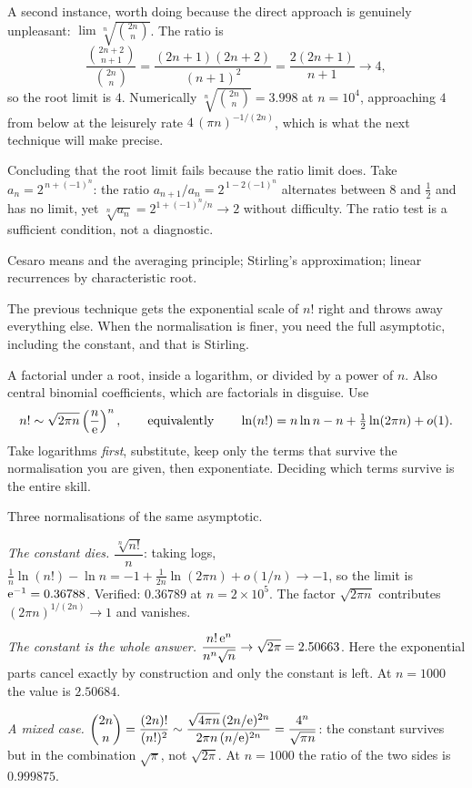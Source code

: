 A second instance, worth doing because the direct approach is genuinely unpleasant: $\lim\sqrt[n]{\binom{2n}{n}}$. The ratio is
\[\frac{\binom{2n+2}{n+1}}{\binom{2n}{n}}=\frac{(2n+1)(2n+2)}{(n+1)^2}=\frac{2(2n+1)}{n+1}\to4,\]
so the root limit is $4$. Numerically $\sqrt[n]{\binom{2n}{n}}=3.998$ at $n=10^4$, approaching $4$ from below at the leisurely rate $4\,(\pi n)^{-1/(2n)}$, which is what the next technique will make precise.

\begin{trap}
Concluding that the root limit fails because the ratio limit does. Take $a_n=2^{\,n+(-1)^n}$: the ratio $a_{n+1}/a_n=2^{\,1-2(-1)^n}$ alternates between $8$ and $\tfrac12$ and has no limit, yet $\sqrt[n]{a_n}=2^{1+(-1)^n/n}\to2$ without difficulty. The ratio test is a sufficient condition, not a diagnostic.
\end{trap}

\begin{seealsob}Cesaro means and the averaging principle; Stirling's approximation; linear recurrences by characteristic root.\end{seealsob}

The previous technique gets the exponential scale of $n!$ right and throws away everything else. When the normalisation is finer, you need the full asymptotic, including the constant, and that is Stirling.

\cue A factorial under a root, inside a logarithm, or divided by a power of $n$. Also central binomial coefficients, which are factorials in disguise.
\method Use
\[n!\sim\sqrt{2\pi n}\left(\frac{n}{\mathrm{e}}\right)^{n},\qquad\text{equivalently}\qquad \ln(n!)=n\ln n-n+\tfrac12\ln(2\pi n)+o(1).\]
Take logarithms \emph{first}, substitute, keep only the terms that survive the normalisation you are given, then exponentiate. Deciding which terms survive is the entire skill.

\begin{worked}
Three normalisations of the same asymptotic.

\emph{The constant dies.} $\dfrac{\sqrt[n]{n!}}{n}$: taking logs, $\tfrac1n\ln(n!)-\ln n=-1+\tfrac{1}{2n}\ln(2\pi n)+o(1/n)\to-1$, so the limit is $\mathrm{e}^{-1}=0.36788$. Verified: $0.36789$ at $n=2\times10^5$. The factor $\sqrt{2\pi n}$ contributes $(2\pi n)^{1/(2n)}\to1$ and vanishes.

\emph{The constant is the whole answer.} $\dfrac{n!\,\mathrm{e}^{n}}{n^{n}\sqrt n}\to\sqrt{2\pi}=2.50663$. Here the exponential parts cancel exactly by construction and only the constant is left. At $n=1000$ the value is $2.50684$.

\emph{A mixed case.} $\dbinom{2n}{n}=\dfrac{(2n)!}{(n!)^2}\sim\dfrac{\sqrt{4\pi n}\,(2n/\mathrm{e})^{2n}}{2\pi n\,(n/\mathrm{e})^{2n}}=\dfrac{4^{n}}{\sqrt{\pi n}}$: the constant survives but in the combination $\sqrt{\pi}$, not $\sqrt{2\pi}$. At $n=1000$ the ratio of the two sides is $0.999875$.
\end{worked}

